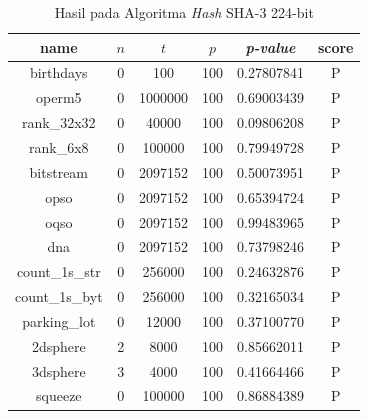 \documentclass[conference]{IEEEtran}
\newcommand{\en}[1]
    {\foreignlanguage{english}{\textit{#1}}}
\begin{document}
\begin{table}[htbp]
    \caption{Hasil  pada Algoritma \en{Hash} SHA-3 224-bit}
    \label{tab:analisis:res-sha3-224}
    \begin{center}
        \begin{tabular}{|c|c|c|c|c|c|}
            \hline
            \textbf{name}  & \textbf{$n$} & \textbf{$t$} & \textbf{$p$} & \textbf{\en{p-value}} & \textbf{score} \\
            \hline
            birthdays      & 0            & 100          & 100          & 0.27807841            & P              \\
            operm5         & 0            & 1000000      & 100          & 0.69003439            & P              \\
            rank\_32x32    & 0            & 40000        & 100          & 0.09806208            & P              \\
            rank\_6x8      & 0            & 100000       & 100          & 0.79949728            & P              \\
            bitstream      & 0            & 2097152      & 100          & 0.50073951            & P              \\
            opso           & 0            & 2097152      & 100          & 0.65394724            & P              \\
            oqso           & 0            & 2097152      & 100          & 0.99483965            & P              \\
            dna            & 0            & 2097152      & 100          & 0.73798246            & P              \\
            count\_1s\_str & 0            & 256000       & 100          & 0.24632876            & P              \\
            count\_1s\_byt & 0            & 256000       & 100          & 0.32165034            & P              \\
            parking\_lot   & 0            & 12000        & 100          & 0.37100770            & P              \\
            2dsphere       & 2            & 8000         & 100          & 0.85662011            & P              \\
            3dsphere       & 3            & 4000         & 100          & 0.41664466            & P              \\
            squeeze        & 0            & 100000       & 100          & 0.86884389            & P              \\

\end{tabular}
\end{center}
\end{table}
\end{document}
